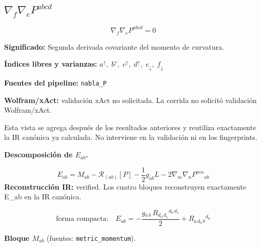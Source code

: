 \documentclass[11pt]{article}
\begin{document}
\subsection*{$ \nabla_f\nabla_e P^{abcd} $}
\begin{dmath*}[breakdepth={5}]
\nabla_f\nabla_e P^{abcd} = 0
\end{dmath*}
\par\vspace{1.2\baselineskip}\noindent
\begin{minipage}{\linewidth}
\textbf{Significado:} Segunda derivada covariante del momento de curvatura.\par
\textbf{Índices libres y varianzas:} $ a^{\uparrow},\;b^{\uparrow},\;c^{\uparrow},\;d^{\uparrow},\;e_{\downarrow},\;f_{\downarrow} $\par
\textbf{Fuentes del pipeline:} \texttt{nabla\_P}\par
\textbf{Wolfram/xAct:} validación xAct no solicitada. La corrida no solicitó validación Wolfram/xAct.\par
\end{minipage}
\par\bigskip{}\par
Esta vista se agrega después de los resultados anteriores y reutiliza exactamente la IR canónica ya calculada. No interviene en la validación ni en los fingerprints.\par
{}
\par\medskip\noindent\textbf{Descomposición de $ E_{ab} $.}\par
\begin{dmath*}[breakdepth={5}]
E_{ab}=M_{ab}-\mathcal{R}_{(ab)}[P]-\frac{1}{2}g_{ab}L-2\nabla_m\nabla_nP^{mn}{}_{ab}
\end{dmath*}
\textbf{Reconstrucción IR:} verified. Los cuatro bloques reconstruyen exactamente E\_ab en la IR canónica.\par
\begin{dmath*}[breakdepth={5}]
\text{forma compacta:}\quad E_{ab} = -\frac{g{}_{a\,b}\,R{}_{d_{0}\,d_{1}}{}^{d_{0}\,d_{1}}}{2} + R{}_{a\,d_{0}\,b}{}^{d_{0}}
\end{dmath*}
\par\smallskip\noindent\textbf{Bloque $ M_{ab} $} (fuentes: \texttt{metric\_momentum}).\par
\end{document}
